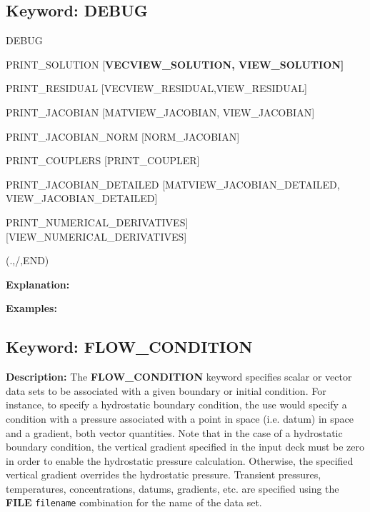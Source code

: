 \documentclass[12pt]{article}
\begin{document}
\subsection{Keyword: DEBUG}
\begin{deflist}{00}
\item[DEBUG]~
\begin{deflist}{00}
\item[PRINT\_SOLUTION] [\bf VECVIEW\_SOLUTION, VIEW\_SOLUTION]
\item[PRINT\_RESIDUAL] [VECVIEW\_RESIDUAL,VIEW\_RESIDUAL]
\item[PRINT\_JACOBIAN] [MATVIEW\_JACOBIAN, VIEW\_JACOBIAN]
\item[PRINT\_JACOBIAN\_NORM] [NORM\_JACOBIAN]
\item[PRINT\_COUPLERS] [PRINT\_COUPLER]
\item[PRINT\_JACOBIAN\_DETAILED] [MATVIEW\_JACOBIAN\_DETAILED, VIEW\_JACOBIAN\_DETAILED]
\item  PRINT\_NUMERICAL\_DERIVATIVES] [VIEW\_NUMERICAL\_DERIVATIVES]
\end{deflist}
\item[(.,/,END)]
\end{deflist}

{\noindent\bf Explanation:}

\bigskip

{\noindent\bf Examples:}


\newpage
\protect\hypertarget{target_flow_cond}{}

\subsection{Keyword: FLOW\_CONDITION}

{\noindent\bf Description:}
The {\bf FLOW\_CONDITION} keyword specifies scalar or vector data sets to be associated with a given boundary or initial condition.  For instance, to specify a hydrostatic boundary condition, the use would specify a condition with a pressure associated with a point in space (i.e. datum) in space and a gradient, both vector quantities.  Note that in the case of a hydrostatic boundary condition, the vertical gradient specified in the input deck must be zero in order to enable the hydrostatic pressure calculation.  Otherwise, the specified vertical gradient overrides the hydrostatic pressure.  Transient pressures, temperatures, concentrations, datums, gradients, etc. are specified using the {\bf FILE} {\tt filename} combination for the name of the data set.
\end{document}
